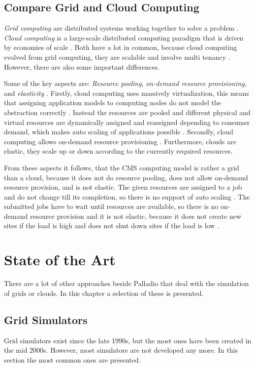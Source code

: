 \section{Compare Grid and Cloud Computing}
\label{grid_cloud}
\textit{Grid computing} are distributed systems working together to solve a problem \cite{mollamotalebi2013grid}.
\textit{Cloud computing} is a large-scale distributed computing paradigm that is driven by economies of scale \cite{foster2008cloud}.
Both have a lot in common, because cloud computing evolved from grid computing, they are scalable and involve multi tenancy \cite{foster2008cloud}.
However, there are also some important differences.

Some of the key aspects are: \textit{Resource pooling}, \textit{on-demand resource provisioning}, and \textit{elasticity} \cite{foster2008cloud}.
Firstly, cloud computing uses massively virtualization, this means that assigning application models to computing nodes do not model the abstraction correctly \cite{cloud_sim}. Instead the resources are pooled and different physical and virtual resources are dynamically assigned and reassigned depending to consumer demand, which makes auto scaling of applications possible \cite{foster2008cloud}.
Secondly, cloud computing allows on-demand resource provisioning \cite{foster2008cloud}. Furthermore, clouds are elastic, they scale up or down according to the currently required resources.

From these aspects it follows, that the CMS computing model is rather a grid than a cloud, because it does not do resource pooling, does not allow on-demand resource provision, and is not elastic.
The given resources are assigned to a job and do not change till its completion, so there is no support of auto scaling \cite{wlcg_update}. The submitted jobs have to wait until resources are available, so there is no on-demand resource provision and it is not elastic, because it does not create new sites if the load is high and does not shut down sites if the load is low \cite{wlcg_update}.


\chapter{State of the Art}
\label{state}
There are a lot of other approaches beside Palladio that deal with the simulation of grids or clouds.
In this chapter a selection of these is presented.


\section{Grid Simulators}
Grid simulators exist since the late 1990s, but the most ones have been created in the mid 2000s. However, most simulators are not developed any more. In this section the most common ones are presented.

